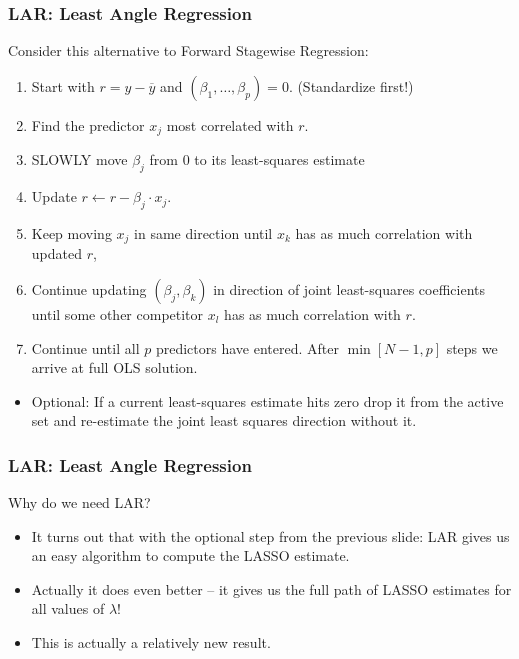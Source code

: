 \begin{frame}
\frametitle{LAR: Least Angle Regression}
\vspace{-5pt}
Consider this alternative to Forward Stagewise Regression:
\begin{enumerate}
\item Start with $r= y-\overline{y}$ and $(\beta_1, \ldots, \beta_p) = 0$. (Standardize first!)
\item Find the predictor $x_j$ most correlated with $r$.
\item SLOWLY move $\beta_j$ from 0 to its least-squares estimate 
\item Update $r \leftarrow r - \beta_j \cdot x_j$.
\item Keep moving $x_j$ in same direction until $x_k$ has as much correlation with updated $r$,
\item Continue updating $(\beta_j, \beta_k)$ in direction of \alert{joint} least-squares coefficients until some other competitor $x_l$ has as much correlation with $r$.
\item Continue until all $p$ predictors have entered. After $\min[N-1,p]$ steps we arrive at full OLS solution.
\end{enumerate}
\begin{itemize}
\item \alert{Optional:} If a current least-squares estimate hits zero drop it from the active set and re-estimate the joint least squares direction without it.
\end{itemize}
\end{frame}


\begin{frame}
\frametitle{LAR: Least Angle Regression}
Why do we need LAR?
\begin{itemize}
\item It turns out that with the optional step from the previous slide: LAR gives us an easy algorithm to compute the LASSO estimate.
\item Actually it does even better -- it gives us the full path of LASSO estimates for all values of $\lambda$!
\item This is actually a relatively new result.
\end{itemize}
\end{frame}


